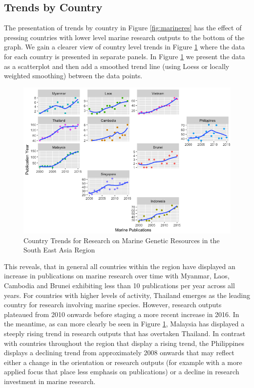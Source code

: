 \documentclass[openany]{book}
\theoremstyle{definition}
\theoremstyle{definition}
\theoremstyle{definition}
\theoremstyle{remark}
\begin{document}
\hypertarget{trends-by-country}{%
\subsection{Trends by Country}\label{trends-by-country}}

The presentation of trends by country in Figure \ref{fig:marineres} has
the effect of pressing countries with lower level marine research
outputs to the bottom of the graph. We gain a clearer view of country
level trends in Figure \ref{fig:marinetrends} where the data for each
country is presented in separate panels. In Figure
\ref{fig:marinetrends} we present the data as a scatterplot and then add
a smoothed trend line (using Loess or locally weighted smoothing)
between the data points.

\begin{figure}

{\centering \includegraphics[width=1\linewidth]{images/country_trends} 

}

\caption{Country Trends for Research on Marine Genetic Resources in the South East Asia Region}\label{fig:marinetrends}
\end{figure}

This reveals, that in general all countries within the region have
displayed an increase in publications on marine research over time with
Myanmar, Laos, Cambodia and Brunei exhibiting less than 10 publications
per year across all years. For countries with higher levels of activity,
Thailand emerges as the leading country for research involving marine
species. However, research outputs plateaued from 2010 onwards before
staging a more recent increase in 2016. In the meantime, as can more
clearly be seen in Figure \ref{fig:marinetrends}, Malaysia has displayed
a steeply rising trend in research outputs that has overtaken Thailand.
In contrast with countries throughout the region that display a rising
trend, the Philippines displays a declining trend from approximately
2008 onwards that may reflect either a change in the orientation or
research outputs (for example with a more applied focus that place less
emphasis on publications) or a decline in research investment in marine
research.
\end{document}
